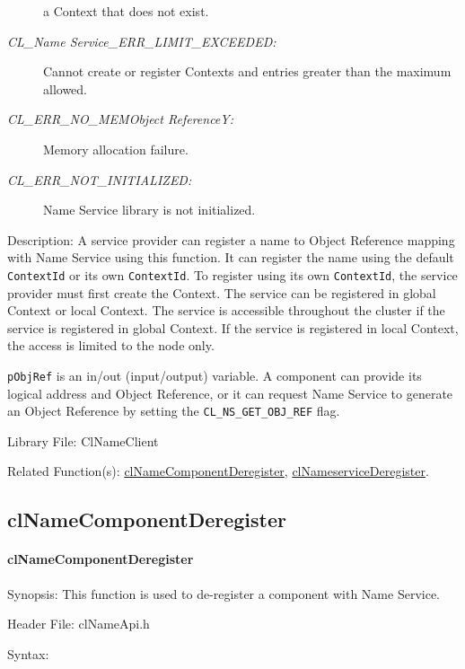 \begin{flushleft}
\begin{Desc}
\begin{description}
a Context that does not exist. 
\item[{\em CL\_\-Name Service\_\-ERR\_\-LIMIT\_\-EXCEEDED:}]
Cannot create or register Contexts and entries greater than the maximum allowed.
\item[{\em CL\_\-ERR\_\-NO\_\-MEMObject ReferenceY:}]Memory allocation failure. 
\item[{\em CL\_\-ERR\_\-NOT\_\-INITIALIZED:}]Name Service library is not initialized.
\end{description}
\end{Desc}
\begin{Desc}
\item[Description:]A service provider can register a name to Object Reference mapping with Name Service using this function. It can register the name 
using the default {\tt{ContextId}} or its own {\tt{ContextId}}. To register using its own {\tt{ContextId}}, the service provider must first create the Context. 
The service can be registered in global Context or local Context. The service is accessible throughout the cluster if the service is registered in global 
Context. If the service is registered in local Context, the access is limited to the node only.
 \par
 {\tt{pObjRef}} is an in/out (input/output) variable. A component can provide its logical address and Object Reference, or it can request Name Service to 
 generate an Object Reference by setting the {\tt{CL\_\-NS\_\-GET\_\-OBJ\_\-REF}} flag.
\end{Desc}
\begin{Desc}
\item[Library File:]Cl\-Name\-Client\end{Desc}
\begin{Desc}
\item[Related Function(s):]\hyperlink{pagens104}{cl\-Name\-Component\-Deregister}, \hyperlink{pagens105}{cl\-Name\-service\-Deregister}. \end{Desc}
\newpage


\subsection{clNameComponentDeregister}
\hypertarget{pagens104}{}\paragraph{cl\-Name\-Component\-Deregister}\label{pagens104}
\begin{Desc}
\item[Synopsis:]This function is used to de-register a component with Name Service.\end{Desc}
\begin{Desc}
\item[Header File:]clNameApi.h\end{Desc}
\begin{Desc}
\item[Syntax:]


\end{Desc}
\end{flushleft}
